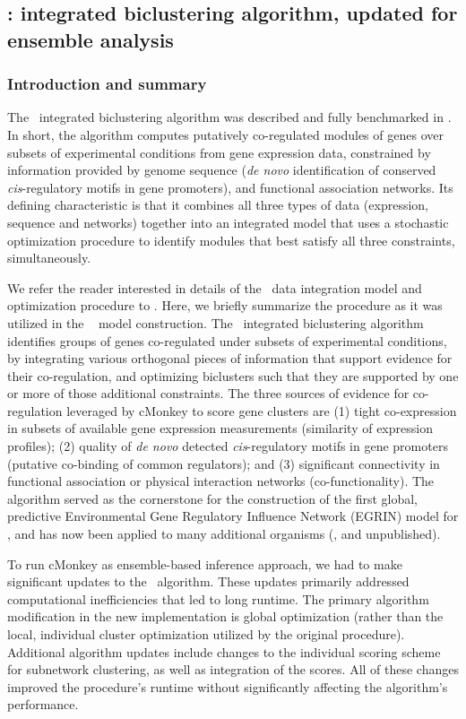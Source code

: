 \subsection{\cm: integrated biclustering algorithm, updated for ensemble analysis}

\subsubsection{Introduction and summary}

The \cm\ integrated biclustering algorithm was described and fully
benchmarked in \cite{Reiss2006n}. In short, the algorithm computes
putatively co-regulated modules of genes over subsets of experimental
conditions from gene expression data, constrained by information
provided by genome sequence (\textit{de novo} identification of
conserved \textit{cis}-regulatory motifs in gene promoters), and functional
association networks. Its defining characteristic is that it
combines all three types of data (expression, sequence and networks)
together into an integrated model that uses a stochastic
optimization procedure to identify modules that best satisfy all three
constraints, simultaneously.

We refer the reader interested in details of the \cm\ data integration
model and optimization procedure to \cite{Reiss2006n}. Here, we
briefly summarize the procedure as it was utilized in the \egrine~
model construction. The \cm\ integrated biclustering algorithm
identifies groups of genes co-regulated under subsets of experimental
conditions, by integrating various orthogonal pieces of information
that support evidence for their co-regulation, and optimizing
biclusters such that they are supported by one or more of those
additional constraints. The three sources of evidence for
co-regulation leveraged by cMonkey to score gene clusters are (1)
tight co-expression in subsets of available gene expression
measurements (similarity of expression profiles); (2) quality of
\textit{de novo} detected \textit{cis}-regulatory motifs in gene
promoters (putative co-binding of common regulators); and (3)
significant connectivity in functional association or physical
interaction networks (co-functionality). The algorithm served as the
cornerstone for the construction of the first global, predictive
Environmental Gene Regulatory Influence Network (EGRIN) model for
\halo \cite{Bonneau2007}, and has now been applied to many additional
organisms (\eg, \cite{Yoon2013} and unpublished).

To run cMonkey as ensemble-based inference approach, we had to make
significant updates to the \cm\ algorithm. These updates primarily
addressed computational inefficiencies that led to long runtime. The
primary algorithm modification in the new implementation is global
optimization (rather than the local, individual cluster optimization
utilized by the original procedure). Additional algorithm updates
include changes to the individual scoring scheme for subnetwork
clustering, as well as integration of the scores. All of these changes
improved the procedure's runtime without significantly affecting the
algorithm's performance.

